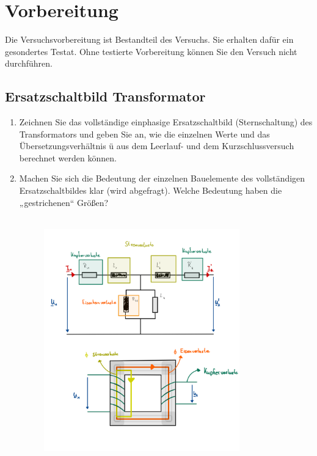 \section{Vorbereitung}
 {Die Versuchsvorbereitung ist Bestandteil des Versuchs. Sie erhalten dafür ein gesondertes Testat.
  Ohne testierte Vorbereitung können Sie den Versuch nicht durchführen.}
\subsection{Ersatzschaltbild Transformator}
\begin{enumerate}[label=\alph*)]
  \item Zeichnen Sie das vollständige einphasige Ersatzschaltbild (Sternschaltung) des
        Transformators und geben Sie an, wie die einzelnen Werte und das
        Übersetzungsverhältnis ü aus dem Leerlauf- und dem Kurzschlussversuch berechnet
        werden können.
  \item Machen Sie sich die Bedeutung der einzelnen Bauelemente des vollständigen
        Ersatzschaltbildes klar (wird abgefragt). Welche Bedeutung haben die
        „gestrichenen“ Größen?\\ \ \\
        \begin{figure}[h!]
          \begin{center}
            \includegraphics[width=0.8\textwidth]{img/2.1.2.4.png}
          \end{center}

\end{figure}
\end{enumerate}
